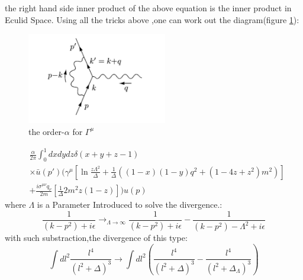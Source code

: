 the right hand side inner product of the above equation is the inner product in Eculid Space.
Using all the tricks above ,one can work out the diagram(figure \ref{fig:vertexcal}):
\begin{figure}
\begin{center}
\includegraphics[height=4cm]{figures/vertexcal}
\caption{the order-$\alpha$ for $\Gamma^\mu$}
\label{fig:vertexcal}
\end{center}
\end{figure}
\begin{align*}
&\frac{\alpha}{2\pi}\int^1_0dxdydz\delta(x+y+z-1)\\
&\times \bar{u}(p')(\gamma^\mu[\ln\frac{z\Lambda^2}{\Delta}+\frac{1}{\Delta}((1-x)(1-y)q^2+(1-4z+z^2)m^2)]\\
&+\frac{i\sigma^{\mu\nu}q_\nu}{2m}[\frac{1}{\Delta}2m^2z(1-z)])u(p)
\end{align*}
where $\Lambda$ is a Parameter Introduced to solve the divergence.:
\[\frac{1}{(k-p^2)+i\epsilon}\rightarrow_{\Lambda\rightarrow \infty} \frac{1}{(k-p^2)+i\epsilon}-\frac{1}{(k-p^2)-\Lambda^2+i\epsilon}\]
with such substraction,the divergence of this type:
\[\int dl^2\frac{l^4}{(l^2+\Delta)^3}\rightarrow\int dl^2(\frac{l^4}{(l^2+\Delta)^3}-\frac{l^4}{(l^2+\Delta_\Lambda)^3})\]
